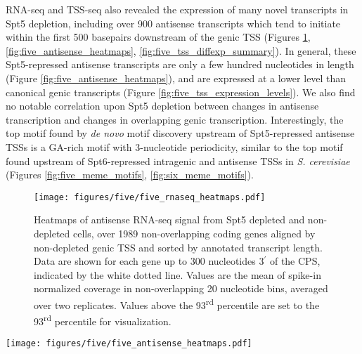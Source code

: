 RNA-seq and TSS-seq also revealed the expression of many novel transcripts in Spt5 depletion, including over 900 antisense transcripts which tend to initiate within the first 500 basepairs downstream of the genic TSS (Figures \ref{fig:five_rnaseq_heatmaps}, \ref{fig:five_antisense_heatmaps}, \ref{fig:five_tss_diffexp_summary}).
In general, these Spt5-repressed antisense transcripts are only a few hundred nucleotides in length (Figure \ref{fig:five_antisense_heatmaps}), and are expressed at a lower level than canonical genic transcripts (Figure \ref{fig:five_tss_expression_levels}).
We also find no notable correlation upon Spt5 depletion between changes in antisense transcription and changes in overlapping genic transcription.
Interestingly, the top motif found by \textit{de novo} motif discovery upstream of Spt5-repressed antisense TSSs is a GA-rich motif with 3-nucleotide periodicity, similar to the top motif found upstream of Spt6-repressed intragenic and antisense TSSs in \textit{S. cerevisiae} (Figures \ref{fig:five_meme_motifs}, \ref{fig:six_meme_motifs}).
\begin{figure}[h]
    \centering
    \texttt{[image: figures/five/five\_rnaseq\_heatmaps.pdf]}
    \caption[Heatmaps of antisense RNA-seq signal from Spt5 depleted and non-depleted cells, over non-overlapping coding genes.]{Heatmaps of antisense RNA-seq signal from Spt5 depleted and non-depleted cells, over 1989 non-overlapping coding genes aligned by non-depleted genic TSS and sorted by annotated transcript length. Data are shown for each gene up to 300 nucleotides 3$^\prime$ of the CPS, indicated by the white dotted line. Values are the mean of spike-in normalized coverage in non-overlapping 20 nucleotide bins, averaged over two replicates. Values above the 93\textsuperscript{rd} percentile are set to the 93\textsuperscript{rd} percentile for visualization.}
    \label{fig:five_rnaseq_heatmaps}
\end{figure}

\clearpage

\begin{sidewaysfigure}
    \centering
    \texttt{[image: figures/five/five\_antisense\_heatmaps.pdf]}
    \caption[Heatmaps of antisense TSS-seq, RNA-seq, and NET-seq signal from Spt5 depleted and non-depleted cells, over genes with Spt5-depletion-induced antisense TSSs.]{Heatmaps of antisense TSS-seq, RNA-seq, and NET-seq signal in Spt5 non-depleted and depleted cells, over all genes overlapping an Spt5-depletion-induced antisense TSS, aligned by the sense, genic TSS and sorted by the distance from the genic TSS to the antisense TSS. Values are the mean of spike-in normalized coverage in non-overlapping 20 nt bins, over one (non-depleted NET-seq) or more experiments. Values above the 0.995 (TSS-seq), 0.98 (RNA-seq), or 0.96 (NET-seq) quantiles are set to their respective quantiles for visualization.}
    \label{fig:five_antisense_heatmaps}
\end{sidewaysfigure}

